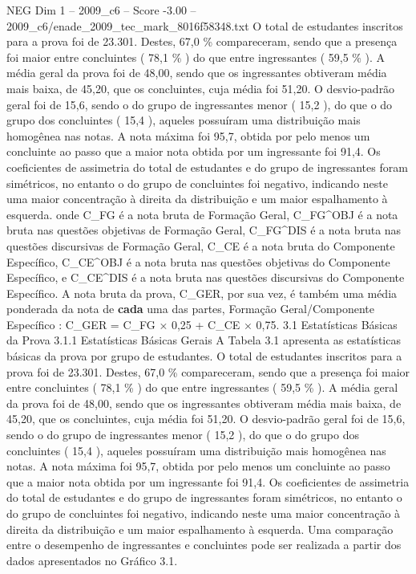 \begin{textsample}{NEG Dim 1 – 2009\_c6 – Score -3.00 – 2009\_c6/enade\_2009\_tec\_mark\_8016f58348.txt}
O total de estudantes inscritos para a prova foi de 23.301.
Destes, 67,0 \% compareceram, sendo que a presença foi maior entre concluintes ( 78,1 \% ) do que entre ingressantes ( 59,5 \% ).
A média geral da prova foi de 48,00, sendo que os ingressantes obtiveram média mais baixa, de 45,20, que os concluintes, cuja média foi 51,20.
O desvio-padrão geral foi de 15,6, sendo o do grupo de ingressantes menor ( 15,2 ), do que o do grupo dos concluintes ( 15,4 ), aqueles possuíram uma distribuição mais homogênea nas notas.
A nota máxima foi 95,7, obtida por pelo menos um concluinte ao passo que a maior nota obtida por um ingressante foi 91,4.
Os coeficientes de assimetria do total de estudantes e do grupo de ingressantes foram simétricos, no entanto o do grupo de concluintes foi negativo, indicando neste uma maior concentração à direita da distribuição e um maior espalhamento à esquerda. onde C\_FG é a nota bruta de Formação Geral, C\_FG\textasciicircum{}OBJ é a nota bruta nas questões objetivas de Formação Geral, C\_FG\textasciicircum{}DIS é a nota bruta nas questões discursivas de Formação Geral, C\_CE é a nota bruta do Componente Específico, C\_CE\textasciicircum{}OBJ é a nota bruta nas questões objetivas do Componente Específico, e C\_CE\textasciicircum{}DIS é a nota bruta nas questões discursivas do Componente Específico.
A nota bruta da prova, C\_GER, por sua vez, é também uma média ponderada da nota de \textbf{cada} uma das partes, Formação Geral/Componente Específico : C\_GER = C\_FG × 0,25 + C\_CE × 0,75. 3.1 Estatísticas Básicas da Prova 3.1.1 Estatísticas Básicas Gerais A Tabela 3.1 apresenta as estatísticas básicas da prova por grupo de estudantes.
O total de estudantes inscritos para a prova foi de 23.301.
Destes, 67,0 \% compareceram, sendo que a presença foi maior entre concluintes ( 78,1 \% ) do que entre ingressantes ( 59,5 \% ).
A média geral da prova foi de 48,00, sendo que os ingressantes obtiveram média mais baixa, de 45,20, que os concluintes, cuja média foi 51,20.
O desvio-padrão geral foi de 15,6, sendo o do grupo de ingressantes menor ( 15,2 ), do que o do grupo dos concluintes ( 15,4 ), aqueles possuíram uma distribuição mais homogênea nas notas.
A nota máxima foi 95,7, obtida por pelo menos um concluinte ao passo que a maior nota obtida por um ingressante foi 91,4.
Os coeficientes de assimetria do total de estudantes e do grupo de ingressantes foram simétricos, no entanto o do grupo de concluintes foi negativo, indicando neste uma maior concentração à direita da distribuição e um maior espalhamento à esquerda.
Uma comparação entre o desempenho de ingressantes e concluintes pode ser realizada a partir dos dados apresentados no Gráfico 3.1.

\end{textsample}
